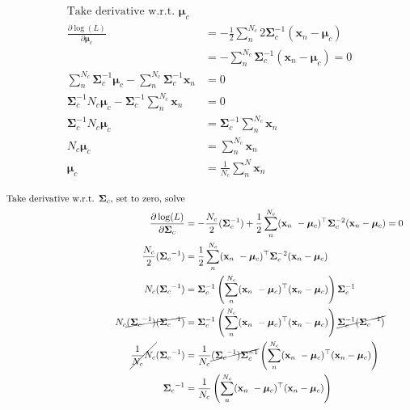 \documentclass[10pt]{article}
\begin{document}
\begin{itemize}
\begin{eqnarray*}
\begin{aligned}
%
%
\text{Take derivative w.r.t. $\boldsymbol \mu_c$}
\\
\frac{\partial \log(L)}{\partial \boldsymbol \mu_c} 
&= -\frac{1}{2} \sum_n^{N_c} 2 \boldsymbol {\Sigma}_c^{-1} (\mathbf{x}_n - \boldsymbol {\mu}_c) 
\\
&= - \sum_n^{N_c} \boldsymbol {\Sigma}_c^{-1} (\mathbf{x}_n - \boldsymbol {\mu}_c) = 0
\\
\sum_n^{N_c} \boldsymbol {\Sigma}_c^{-1} \boldsymbol {\mu}_c - \sum_n^{N_c} \boldsymbol {\Sigma}_c^{-1} \mathbf{x}_n  &= 0
\\
\boldsymbol {\Sigma}_c^{-1} N_c \boldsymbol {\mu}_c - \boldsymbol {\Sigma}_c^{-1} \sum_n^{N_c} \mathbf{x}_n &= 0
\\
\boldsymbol {\Sigma}_c^{-1} N_c \boldsymbol {\mu}_c &= \boldsymbol {\Sigma}_c^{-1} \sum_n^{N_c} \mathbf{x}_n
\\
N_c \boldsymbol {\mu}_c &= \sum_n^{N_c} \mathbf{x}_n
\\
\boldsymbol {\mu}_c &= \frac{1}{N_c} \sum_n^N  \mathbf{x}_n 
\end{aligned}
\end{eqnarray*}

\begin{eqnarray*}
\begin{aligned}
%
%
\text{Take derivative w.r.t. $\boldsymbol {\Sigma}_c$, set to zero, solve}
\\
\frac{\partial \log(L)}{\partial \boldsymbol {\Sigma}_c} 
&=
- \frac{N_c}{2} ( \boldsymbol {\Sigma}_c ^{-1} )
+ \frac{1}{2} 
\sum_n^{N_c} (\mathbf{x}_n\ - \boldsymbol {\mu}_c)^\top \boldsymbol {\Sigma}_c^{-2} (\mathbf{x}_n - \boldsymbol {\mu}_c) = 0
\\
\frac{N_c}{2} ({ \boldsymbol {\Sigma}_c }^{-1}) &=
\frac{1}{2} 
\sum_n^{N_c} (\mathbf{x}_n\ - \boldsymbol {\mu}_c)^\top \boldsymbol {\Sigma}_c^{-2} (\mathbf{x}_n - \boldsymbol {\mu}_c)
\\
N_c ({ \boldsymbol {\Sigma}_c }^{-1}) &= 
\boldsymbol {\Sigma}_c^{-1} \left(
\sum_n^{N_c} (\mathbf{x}_n\ - \boldsymbol {\mu}_c)^\top  (\mathbf{x}_n - \boldsymbol {\mu}_c) 
\right) \boldsymbol {\Sigma}_c^{-1}
\\
N_c \cancel{ ({ \boldsymbol {\Sigma}_c }^{-1}) ({ \boldsymbol {\Sigma}_c }^{-1}) } &= 
\boldsymbol {\Sigma}_c^{-1} \left(
\sum_n^{N_c} (\mathbf{x}_n\ - \boldsymbol {\mu}_c)^\top  (\mathbf{x}_n - \boldsymbol {\mu}_c) 
\right)
\cancel{ \boldsymbol {\Sigma}_c^{-1} ({ \boldsymbol {\Sigma}_c }^{-1}) }
\\
\cancel{ \frac{1}{N_c} N_c } ({ \boldsymbol {\Sigma}_c }^{-1}) &= 
\frac{1}{N_c}
\cancel{ ({ \boldsymbol {\Sigma}_c }^{-1}) \boldsymbol {\Sigma}_c^{-1} }
\left( \sum_n^{N_c} (\mathbf{x}_n\ - \boldsymbol {\mu}_c)^\top  (\mathbf{x}_n - \boldsymbol {\mu}_c) \right) 
\\
{ \boldsymbol {\Sigma}_c }^{-1} &= 
\frac{1}{N_c} \left( \sum_n^{N_c} (\mathbf{x}_n\ - \boldsymbol {\mu}_c)^\top  (\mathbf{x}_n - \boldsymbol {\mu}_c) \right) 
\end{aligned}
\end{eqnarray*}


\end{itemize}
\end{document}
